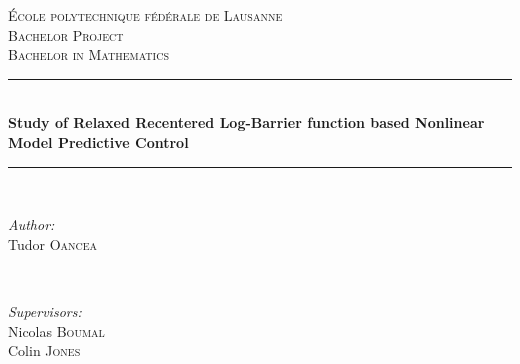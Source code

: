 \begin{titlepage}
\newcommand{\HRule}{\rule{\linewidth}{0.5mm}} %

\center %


\vspace{3cm}
\textsc{\LARGE École polytechnique fédérale de Lausanne}\\[1.5cm] %
\textsc{\Large Bachelor Project}\\[0.5cm] %
\textsc{\large Bachelor in Mathematics}\\[0.5cm] %


\begin{doublespace}
    \HRule \\[0.4cm]
    \huge \bfseries Study of Relaxed Recentered Log-Barrier function based Nonlinear Model Predictive Control\\[0.4cm]
    \HRule \\[1.5cm]
\end{doublespace}


\begin{minipage}{0.4\textwidth}
\begin{flushleft} \large
\emph{Author:}\\
Tudor \textsc{Oancea} %
\end{flushleft}
\end{minipage}
~
\begin{minipage}{0.4\textwidth}
\begin{flushright} \large
\emph{Supervisors:} \\
Nicolas \textsc{Boumal}\\
Colin \textsc{Jones}
\end{flushright}
\end{minipage}


\end{titlepage}
